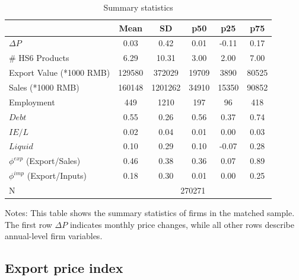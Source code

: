 \begin{table}[htbp]
    \centering
    \caption{Summary statistics}
    \begin{threeparttable}
    \begin{tabular}{lccccc}
    \toprule
            &        Mean&          SD&         p50&         p25&         p75\\
    \midrule
    $\Delta P$        &        0.03&        0.42&        0.01&       -0.11&        0.17\\
    \# HS6 Products           &        6.29&       10.31&        3.00&        2.00&        7.00\\
    Export Value (*1000 RMB)    &   129580&   372029&    19709&     3890&    80525\\
    Sales (*1000 RMB)   &   160148&  1201262&    34910&    15350&    90852\\
    Employment     &      449&     1210&      197&       96&      418\\
    $Debt$              &        0.55&        0.26&        0.56&        0.37&        0.74\\
    $IE/L$               &        0.02&        0.04&        0.01&        0.00&        0.03\\
    $Liquid$       &        0.10 &        0.29 &        0.10 &       -0.07 &        0.28\\
    $\phi^{exp}$ (Export/Sales)         &        0.46&        0.38&        0.36&        0.07&        0.89\\
    $\phi^{imp}$ (Export/Inputs)               &        0.18&        0.30&        0.01&        0.00&        0.25\\
    \midrule
    N        &     \multicolumn{5}{c}{270271}      \\
    \bottomrule
    \end{tabular}
        \begin{tablenotes}
		\footnotesize
            \item Notes: This table shows the summary statistics of firms in the matched sample. The first row $\Delta P$ indicates monthly price changes, while all other rows describe annual-level firm variables.
	\end{tablenotes}
	\end{threeparttable}
    \label{tab.summary}
\end{table}

\subsection{Export price index}

